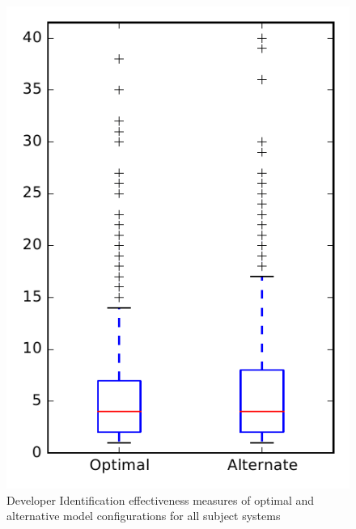
\begin{figure}
\centering
\includegraphics[height=0.4\textheight]{figures/combo/dit_rq1_overview}
\caption{Developer Identification effectiveness measures of optimal and alternative model configurations for all subject systems}
\label{fig:combo:dit:rq1:overview}
\end{figure}
